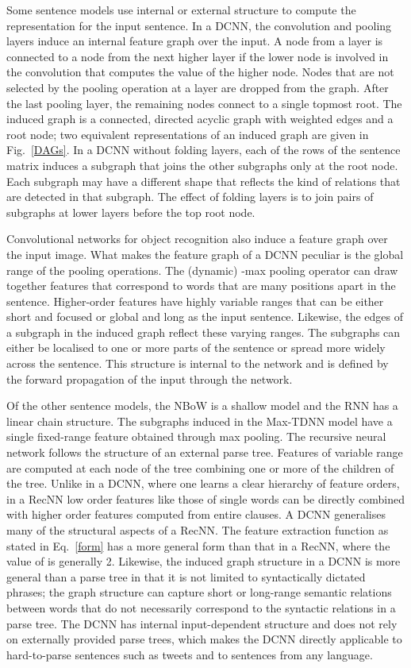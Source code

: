 \documentclass[11pt]{article}
\begin{document}
Some sentence models use internal or external structure to compute the representation for the input sentence. In a DCNN, the convolution and pooling layers induce an internal feature  graph over the input. A node from a layer is connected to a node from the next higher layer if the lower node is involved in the convolution that computes the value of the higher node. Nodes that are not selected by the pooling operation at a layer are dropped from the graph. After the last pooling layer, the remaining nodes connect to a single topmost root.  The induced graph is a connected, directed acyclic graph with weighted edges and a root node; two equivalent representations of an induced graph are given in Fig.~\ref{DAGs}. In a DCNN without folding layers, each of the  rows of the sentence matrix induces a subgraph that joins the other subgraphs only at the root node. Each  subgraph may have a different shape that reflects the kind of relations that are detected in that subgraph. The effect of folding layers is to join pairs of subgraphs at lower layers before the top root node. 

Convolutional networks for object recognition also induce a feature graph over the input image. What makes the feature graph of a DCNN peculiar is the global range of the pooling operations. The (dynamic) -max pooling operator can draw together features that correspond to words that are many positions apart in the sentence. Higher-order features have highly variable ranges that can be either short and focused or global and long as the input sentence. Likewise, the edges of a subgraph in the induced graph reflect these varying ranges. The subgraphs can either be localised to one or more parts of the sentence or spread more widely across the sentence. This structure is internal to the network and is defined by the forward propagation of the input through the network. 

Of the other sentence models, the NBoW is a shallow model and the RNN has a linear chain structure. The subgraphs induced in the Max-TDNN model have a single fixed-range feature obtained through max pooling. The recursive neural network follows the structure of an external  parse tree. Features of variable range are computed at each node of the tree combining one or more of the children of the tree. Unlike in a DCNN, where one learns a clear hierarchy of feature orders, in a RecNN low order features like those of single words can be directly combined with higher order features computed from entire clauses. A DCNN generalises many of the structural aspects of a RecNN. The feature extraction function as stated in Eq.~\ref{form} has a more general form than that in a RecNN, where the value of  is generally 2. Likewise, the induced graph structure in a DCNN is more general than a parse tree in that it is not limited to syntactically dictated phrases; the graph structure can capture short or long-range semantic relations between words that do not necessarily correspond to the syntactic relations in a parse tree. The DCNN has internal input-dependent structure and does not rely on externally provided parse trees, which makes the DCNN directly applicable to hard-to-parse sentences such as tweets and to sentences from any language.
\end{document}
